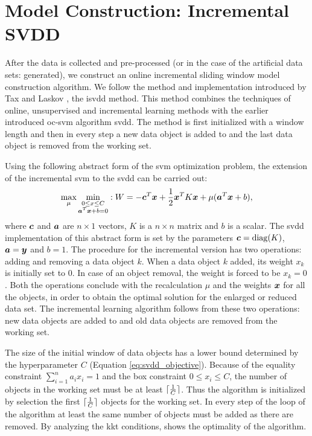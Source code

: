 \section{Model Construction: Incremental SVDD}\label{sec:method_model_construction}
After the data is collected and pre-processed (or in the case of the artificial data sets: generated), we construct an online incremental sliding window model construction algorithm.
We follow the method and implementation introduced by Tax and Laskov \cite{tax2003online}, the \acrlong{isvdd} method.
This method combines the techniques of online, unsupervised and incremental learning methods with the earlier introduced \gls{oc-svm} algorithm \gls{svdd}.
The method is first initialized with a window length and then in every step a new data object is added to and the last data object is removed from the working set.

Using the following abstract form of the \gls{svm} optimization problem, the extension of the incremental \gls{svm} to the \gls{svdd} can be carried out:
\begin{equation}
  \operatorname*{max}_\mu \operatorname*{min}_{\substack{
    0 \le x \le C \\
    \vectorsym{a}^T \vectorsym{x} + b = 0}
  } : W = -\vectorsym{c}^T\vectorsym{x} + \frac{1}{2}\vectorsym{x}^T K\vectorsym{x} + \mu(\vectorsym{a}^T\vectorsym{x} + b),
\end{equation}
where $\vectorsym{c}$ and $\vectorsym{a}$ are $n \times 1$ vectors, $K$ is a $n \times n$ matrix and $b$ is a scalar.
The \gls{svdd} implementation of this abstract form is set by the parameters $\vectorsym{c}=\operatorname*{diag}(K)$, $\vectorsym{a} = \vectorsym{y}$ and $b=1$.
The procedure for the incremental version has two operations: adding and removing a data object $k$.
When a data object $k$ added, its weight $x_k$ is initially set to $0$.
In case of an object removal, the weight is forced to be $x_k=0$.
Both the operations conclude with the recalculation $\mu$ and the weights $\vectorsym{x}$ for all the objects, in order to obtain the optimal solution for the enlarged or reduced data set.
The incremental learning algorithm follows from these two operations: new data objects are added to and old data objects are removed from the working set.

The size of the initial window of data objects has a lower bound determined by the hyperparameter $C$ (Equation \ref{eq:svdd_objective}).
Because of the equality constraint $\sum_{i=1}^n a_i x_i = 1$ and the box constraint $0 \le x_i \le C$, the number of objects in the working set must be at least $\lceil\frac{1}{C}\rceil$.
Thus the algorithm is initialized by selection the first $\lceil\frac{1}{C}\rceil$ objects for the working set.
In every step of the loop of the algorithm at least the same number of objects must be added as there are removed.
By analyzing the \gls{kkt} conditions, \cite{tax2003online} shows the optimality of the algorithm.

